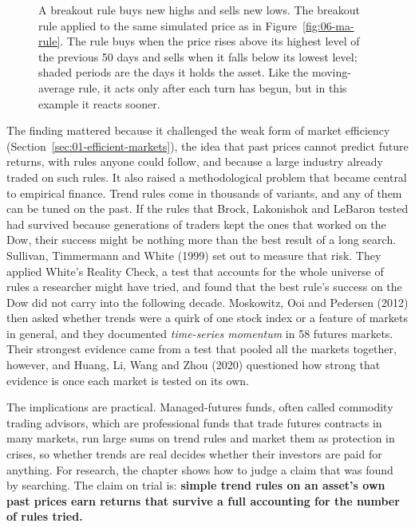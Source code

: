 \begin{figure}[htbp]
\caption{A breakout rule buys new highs and sells new lows. The breakout rule applied to the same simulated price as in Figure~\ref{fig:06-ma-rule}. The rule buys when the price rises above its highest level of the previous 50 days and sells when it falls below its lowest level; shaded periods are the days it holds the asset. Like the moving-average rule, it acts only after each turn has begun, but in this example it reacts sooner.}
\label{fig:06-breakout-rule}
\end{figure}


The finding mattered because it challenged the weak form of market efficiency (Section~\ref{sec:01-efficient-markets}), the idea that past prices cannot predict future returns, with rules anyone could follow, and because a large industry already traded on such rules. It also raised a methodological problem that became central to empirical finance. Trend rules come in thousands of variants, and any of them can be tuned on the past. If the rules that Brock, Lakonishok and LeBaron tested had survived because generations of traders kept the ones that worked on the Dow, their success might be nothing more than the best result of a long search. Sullivan, Timmermann and White (1999) set out to measure that risk. They applied White's Reality Check, a test that accounts for the whole universe of rules a researcher might have tried, and found that the best rule's success on the Dow did not carry into the following decade. Moskowitz, Ooi and Pedersen (2012) then asked whether trends were a quirk of one stock index or a feature of markets in general, and they documented \emph{time-series momentum} in 58 futures markets. Their strongest evidence came from a test that pooled all the markets together, however, and Huang, Li, Wang and Zhou (2020) questioned how strong that evidence is once each market is tested on its own.

The implications are practical. Managed-futures funds, often called commodity trading advisors, which are professional funds that trade futures contracts in many markets, run large sums on trend rules and market them as protection in crises, so whether trends are real decides whether their investors are paid for anything. For research, the chapter shows how to judge a claim that was found by searching. The claim on trial is: \textbf{simple trend rules on an asset's own past prices earn returns that survive a full accounting for the number of rules tried.}

